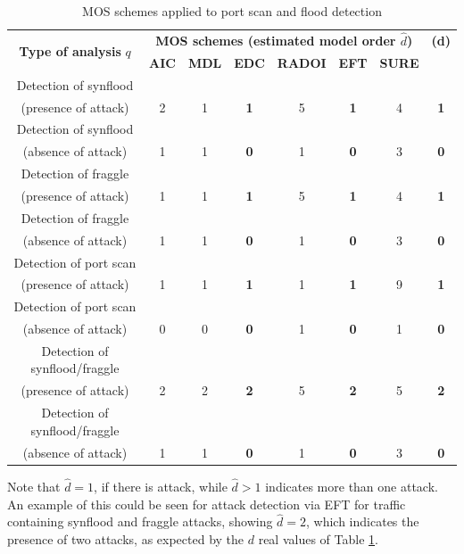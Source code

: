 \begin{table}[h!]
  \centering
  \caption{MOS schemes applied to port scan and flood detection}
  \label{tab:tab4}
  \begin{tabular}{ c c c c c c c c }
	\toprule
	\multirow{2}{*}{\textbf{Type of analysis} $q$} &\multicolumn{6}{c}{\textbf{MOS schemes (estimated model order $\hat{d}$)}} &{\textbf{(d)}}\\ 
			\hhline{~------~}
		&\textbf{AIC} &\textbf{MDL} &\textbf{EDC} &\textbf{RADOI} &\textbf{EFT} &\textbf{SURE}\\
	\midrule
	Detection of synflood \\(presence of attack) &2 &1 &\textbf{1} &5 &\textbf{1} &4 &\textbf{1} \\
	Detection of synflood \\(absence of attack) &1 &1 &\textbf{0} &1 &\textbf{0} &3 &\textbf{0} \\
	\midrule
	Detection of fraggle \\(presence of attack) &1 &1 &\textbf{1} &5 &\textbf{1} &4 &\textbf{1} \\
	Detection of fraggle \\(absence of attack) &1 &1 &\textbf{0} &1 &\textbf{0} &3 &\textbf{0} \\
	\midrule
	Detection of port scan \\(presence of attack) &1 &1 &\textbf{1} &1 &\textbf{1} &9 &\textbf{1} \\
	Detection of port scan \\(absence of attack) &0 &0 &\textbf{0} &1 &\textbf{0} &1 &\textbf{0} \\
	\midrule
	Detection of synflood/fraggle \\(presence of attack) &2 &2 &\textbf{2} &5 &\textbf{2} &5 &\textbf{2} \\
	Detection of synflood/fraggle \\(absence of attack) &1 &1 &\textbf{0} &1 &\textbf{0} &3 &\textbf{0} \\
    \bottomrule
  \end{tabular}
\end{table}

Note that $\hat{d} = 1$, if there is attack, while $\hat{d} > 1$ indicates more than one attack. An example of this could be seen for attack detection via EFT for traffic containing synflood and fraggle attacks, showing $\hat{d} = 2$, which indicates the presence of two attacks, as expected by the $d$ real values of Table \ref{tab:tab4}. 

